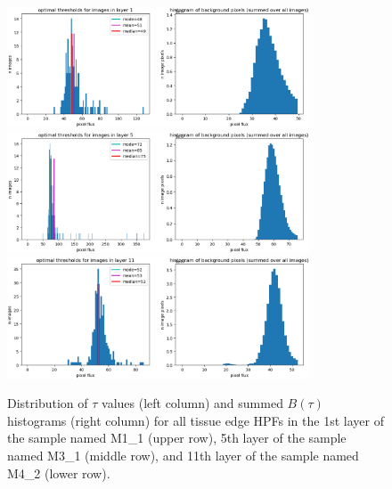 \documentclass[letterpaper,11pt]{article}
\begin{document}
\begin{figure}[!ht]
\centering
\includegraphics[width=0.80\textwidth]{images/masking/M1_1_layer_1_background_threshold_plots}
\includegraphics[width=0.80\textwidth]{images/masking/M3_1_layer_5_background_threshold_plots}
\includegraphics[width=0.80\textwidth]{images/masking/M4_2_layer_11_background_threshold_plots}
\caption{\footnotesize Distribution of $\tau$ values (left column) and summed $B(\tau)$ histograms (right column) for all tissue edge HPFs in the 1st layer of the sample named M1\_1 (upper row), 5th layer of the sample named M3\_1 (middle row), and 11th layer of the sample named M4\_2 (lower row).}
\label{fig:threshold_distributions_1}
\end{figure}
\end{document}
